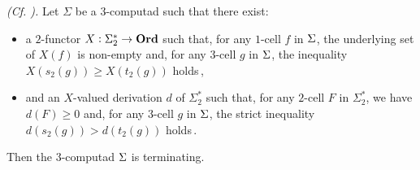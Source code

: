 \documentclass[reqno,12pt]{amsart}
\begin{document}
\begin{proposition}\label{prop:termination lemma} \emph{(Cf. \cite[Thm. 4.2.1]{GuMa}).}
	Let $\Sigma$ be a $3$-computad such that there exist:
	\begin{itemize}
		\item a $2$-functor $X:\Sigma^{\ast}_2 \to \mathbf{Ord}$ such that, for any $1$-cell $f$ in $\Sigma$, the underlying set of $X(f)$ is non-empty and, for any $3$-cell $g$ in $\Sigma$, the inequality $X(s_2(g))\geq X(t_2(g))$ holds\,,
		\item and an $X$-valued derivation $d$ of $\Sigma^{\ast}_2$ such that, for any $2$-cell $F$ in $\Sigma^{\ast}_2$, we have $d(F)\geq 0$ and, for any $3$-cell $g$ in $\Sigma$, the strict inequality $d(s_2(g))>d(t_2(g))$ holds\,.
	\end{itemize}
	
	\noindent Then the $3$-computad $\Sigma$ is terminating.
\end{proposition}

\pagebreak
\end{document}
